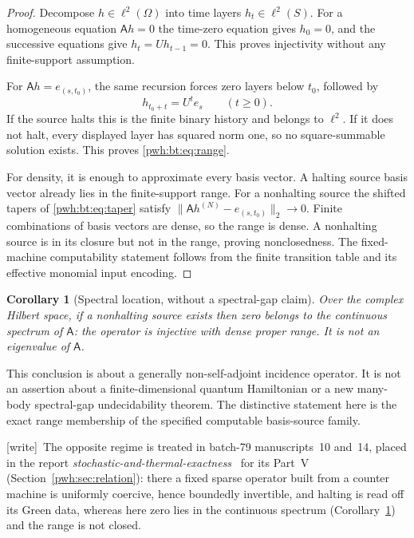 \documentclass[11pt,letterpaper]{article}
\numberwithin{equation}{section}
\newtheorem{corollary}[theorem]{Corollary}
\theoremstyle{definition}
\newcommand{\Ann}{\mathsf{A}}
\newcommand{\wtag}{\textup{[write]}}
\begin{document}
\begin{proof}
Decompose $h\in\ell^2(\Omega)$ into time layers $h_t\in\ell^2(S)$.
For a homogeneous equation $\Ann h=0$ the time-zero equation gives
$h_0=0$, and the successive equations give $h_t=Uh_{t-1}=0$.
This proves injectivity without any finite-support assumption.

For $\Ann h=e_{(s,t_0)}$, the same recursion forces zero layers below
$t_0$, followed by
\[
 h_{t_0+t}=U^te_s\qquad(t\ge0).
\]
If the source halts this is the finite binary history and belongs to
$\ell^2$. If it does not halt, every displayed layer has squared norm
one, so no square-summable solution exists. This proves
\eqref{pwh:bt:eq:range}.

For density, it is enough to approximate every basis vector. A halting
source basis vector already lies in the finite-support range. For a
nonhalting source the shifted tapers of \eqref{pwh:bt:eq:taper} satisfy
$\|\Ann h^{(N)}-e_{(s,t_0)}\|_2\to0$. Finite combinations of basis
vectors are dense, so the range is dense. A nonhalting source is in its
closure but not in the range, proving nonclosedness. The fixed-machine
computability statement follows from the finite transition table and
its effective monomial input encoding.
\end{proof}

\begin{corollary}[Spectral location, without a spectral-gap claim]\label{pwh:bt:cor:spectral}
Over the complex Hilbert space, if a nonhalting source exists then zero
belongs to the continuous spectrum of $\Ann$: the operator is injective
with dense proper range. It is not an eigenvalue of $\Ann$.
\end{corollary}

This conclusion is about a generally non-self-adjoint incidence
operator. It is not an assertion about a finite-dimensional quantum
Hamiltonian or a new many-body spectral-gap undecidability theorem.
The distinctive statement here is the exact range membership of the
specified computable basis-source family.

\wtag\ The opposite regime is treated in batch-79 manuscripts~10 and~14,
placed in the report \emph{stochastic-and-thermal-exactness}~\cite{ste} for
its Part~V (Section~\ref{pwh:sec:relation}): there a fixed sparse operator
built from a counter machine is uniformly coercive, hence boundedly
invertible, and halting is read off its Green data, whereas here zero lies
in the continuous spectrum (Corollary~\ref{pwh:bt:cor:spectral}) and the
range is not closed.
\end{document}
